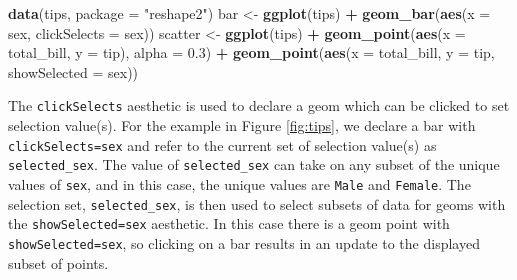 \documentclass[12pt,]{article}
\newenvironment{Shaded}{\begin{snugshade}}{\end{snugshade}}
\newcommand{\DataTypeTok}[1]{\textcolor[rgb]{0.13,0.29,0.53}{#1}}
\newcommand{\FloatTok}[1]{\textcolor[rgb]{0.00,0.00,0.81}{#1}}
\newcommand{\KeywordTok}[1]{\textcolor[rgb]{0.13,0.29,0.53}{\textbf{#1}}}
\newcommand{\NormalTok}[1]{#1}
\newcommand{\OperatorTok}[1]{\textcolor[rgb]{0.81,0.36,0.00}{\textbf{#1}}}
\newcommand{\StringTok}[1]{\textcolor[rgb]{0.31,0.60,0.02}{#1}}
\theoremstyle{definition}
\theoremstyle{definition}
\theoremstyle{definition}
\theoremstyle{remark}
\begin{document}
\begin{Shaded}
\begin{Highlighting}[]
\KeywordTok{data}\NormalTok{(tips, }\DataTypeTok{package =} \StringTok{"reshape2"}\NormalTok{)}
\NormalTok{bar <-}\StringTok{ }\KeywordTok{ggplot}\NormalTok{(tips) }\OperatorTok{+}\StringTok{ }
\StringTok{  }\KeywordTok{geom_bar}\NormalTok{(}\KeywordTok{aes}\NormalTok{(}\DataTypeTok{x =}\NormalTok{ sex, }\DataTypeTok{clickSelects =}\NormalTok{ sex))}
\NormalTok{scatter <-}\StringTok{ }\KeywordTok{ggplot}\NormalTok{(tips) }\OperatorTok{+}
\StringTok{  }\KeywordTok{geom_point}\NormalTok{(}\KeywordTok{aes}\NormalTok{(}\DataTypeTok{x =}\NormalTok{ total_bill, }\DataTypeTok{y =}\NormalTok{ tip), }\DataTypeTok{alpha =} \FloatTok{0.3}\NormalTok{) }\OperatorTok{+}
\StringTok{  }\KeywordTok{geom_point}\NormalTok{(}\KeywordTok{aes}\NormalTok{(}\DataTypeTok{x =}\NormalTok{ total_bill, }\DataTypeTok{y =}\NormalTok{ tip, }\DataTypeTok{showSelected =}\NormalTok{ sex))}
\end{Highlighting}
\end{Shaded}

The \texttt{clickSelects} aesthetic is used to declare a geom which can
be clicked to set selection value(s). For the example in Figure
\ref{fig:tips}, we declare a bar with \texttt{clickSelects=sex} and
refer to the current set of selection value(s) as
\texttt{selected\_sex}. The value of \texttt{selected\_sex} can take on
any subset of the unique values of \texttt{sex}, and in this case, the
unique values are \texttt{Male} and \texttt{Female}. The selection set,
\texttt{selected\_sex}, is then used to select subsets of data for geoms
with the \texttt{showSelected=sex} aesthetic. In this case there is a
geom point with \texttt{showSelected=sex}, so clicking on a bar results
in an update to the displayed subset of points.
\end{document}
